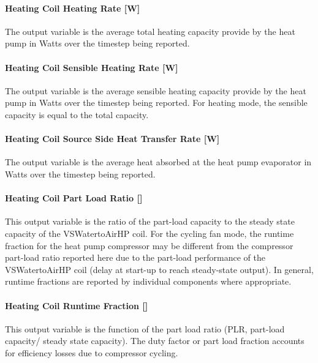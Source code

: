 \paragraph{Heating Coil Heating Rate {[}W{]}}\label{heating-coil-heating-rate-w-11}

The output variable is the average total heating capacity provide by the heat pump in Watts over the timestep being reported.

\paragraph{Heating Coil Sensible Heating Rate {[}W{]}}\label{heating-coil-sensible-heating-rate-w-2}

The output variable is the average sensible heating capacity provide by the heat pump in Watts over the timestep being reported. For heating mode, the sensible capacity is equal to the total capacity.

\paragraph{Heating Coil Source Side Heat Transfer Rate {[}W{]}}\label{heating-coil-source-side-heat-transfer-rate-w-2}

The output variable is the average heat absorbed at the heat pump evaporator in Watts over the timestep being reported.

\paragraph{Heating Coil Part Load Ratio {[]}}\label{heating-coil-part-load-ratio-2}

This output variable is the ratio of the part-load capacity to the steady state capacity of the VSWatertoAirHP coil. For the cycling fan mode, the runtime fraction for the heat pump compressor may be different from the compressor part-load ratio reported here due to the part-load performance of the VSWatertoAirHP coil (delay at start-up to reach steady-state output). In general, runtime fractions are reported by individual components where appropriate.

\paragraph{Heating Coil Runtime Fraction {[]}}\label{heating-coil-runtime-fraction-8}

This output variable is the function of the part load ratio (PLR, part-load capacity/ steady state capacity). The duty factor or part load fraction accounts for efficiency losses due to compressor cycling.

